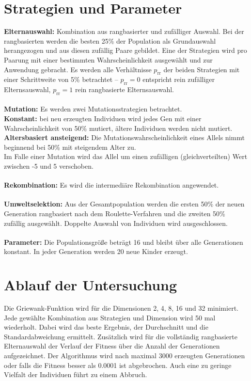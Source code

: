\documentclass[12pt,
    a4paper,
    headinclude,
    footinclude]{scrartcl}
\begin{document}
	\section{Strategien und Parameter}

	\textbf{Elternauswahl:} Kombination aus rangbasierter und zufälliger Auswahl. Bei der rangbasierten werden die besten 25\% der Population als Grundauswahl herangezogen und aus diesen zufällig Paare gebildet.
	Eine der Strategien wird pro Paarung mit einer bestimmten Wahrscheinlichkeit ausgewählt und zur Anwendung gebracht. Es werden alle Verhältnisse $p_\text{rr}$ der beiden Strategien mit einer Schrittweite von 5\% betrachtet -- $p_\text{rr} = 0$ entspricht rein zufälliger Elternsauswahl, $p_\text{rr} = 1$ rein rangbasierte Elternsauswahl.\\\\	
	\textbf{Mutation:} Es werden zwei Mutationsstrategien betrachtet. \\
	\textbf{Konstant:} bei neu erzeugten Individuen wird jedes Gen mit einer Wahrscheinlichkeit von 50\% mutiert, ältere Individuen werden nicht mutiert.
	\textbf{Altersbasiert ansteigend:} Die Mutationswahrscheinlichkeit eines Allels nimmt beginnend bei 50\% mit steigendem Alter zu.\\
	Im Falle einer Mutation wird das Allel um einen zufälligen (gleichverteilten) Wert zwischen -5 und 5 verschoben. \\\\
	\textbf{Rekombination:} Es wird die intermediäre Rekombination angewendet.\\\\
	\textbf{Umweltselektion:} Aus der Gesamtpopulation werden die ersten 50\% der neuen Generation rangbasiert nach dem Roulette-Verfahren und die zweiten 50\% zufällig ausgewählt. Doppelte Auswahl von Individuen wird ausgeschlossen.\\\\
	\textbf{Parameter:} Die Populationsgröße beträgt 16 und bleibt über alle Generationen konstant. In jeder Generation werden 20 neue Kinder erzeugt.
	
	\section{Ablauf der Untersuchung}
	Die Griewank-Funktion wird für die Dimensionen 2, 4, 8, 16 und 32 minimiert. Jede gewählte Kombination aus Strategien und Dimension wird 50 mal wiederholt. Dabei wird das beste Ergebnis, der Durchschnitt und die Standardabweichung ermittelt. Zusätzlich wird für die vollständig rangbasierte Elternauswahl der Verlauf der Fitness über die Anzahl der Generationen aufgezeichnet. Der Algorithmus wird nach maximal 3000 erzeugten Generationen oder falls die Fitness besser als 0.0001 ist abgebrochen. Auch eine zu geringe Vielfalt der Individuen führt zu einem Abbruch.
\newpage
\end{document}
